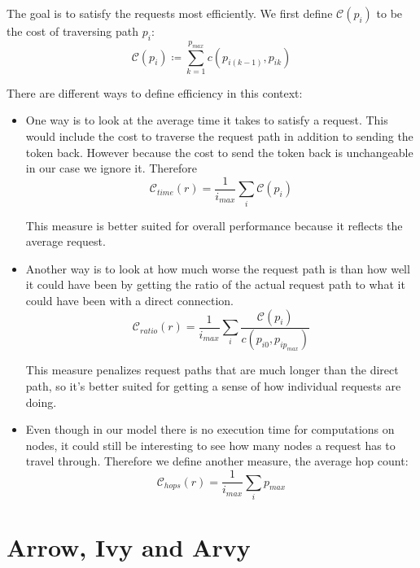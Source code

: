 \documentclass[a4paper, oneside]{discothesis}
\begin{document}
The goal is to satisfy the requests most efficiently. We first define $\mathcal{C}(p_i)$ to be the cost of traversing path $p_i$:
\begin{equation}
\mathcal{C}(p_i)\coloneqq\sum_{k=1}^{p_{max}}c(p_{i(k-1)}, p_{ik})
\end{equation}

There are different ways to define efficiency in this context:
\begin{itemize}
\item
  One way is to look at the average time it takes to satisfy a request. This would include the cost to traverse the request path in addition to sending the token back. However because the cost to send the token back is unchangeable in our case we ignore it. Therefore
  \begin{equation}
    \mathcal{C}_{time}(r) = \frac{1}{i_{max}}\sum_i\mathcal{C}(p_i)
  \end{equation}

  This measure is better suited for overall performance because it reflects the average request.
  
\item
  Another way is to look at how much worse the request path is than how well it could have been by getting the ratio of the actual request path to what it could have been with a direct connection.
  \begin{equation}
    \mathcal{C}_{ratio}(r) = \frac{1}{i_{max}}\sum_i\frac{\mathcal{C}(p_i)}{c(p_{i0},p_{ip_{max}})}
  \end{equation}

  This measure penalizes request paths that are much longer than the direct path, so it's better suited for getting a sense of how individual requests are doing.

\item
  Even though in our model there is no execution time for computations on nodes, it could still be interesting to see how many nodes a request has to travel through. Therefore we define another measure, the average hop count:
  \begin{equation}
    \mathcal{C}_{hops}(r) = \frac{1}{i_{max}}\sum_ip_{max}
  \end{equation}
\end{itemize}

\section{Arrow, Ivy and Arvy}
\end{document}
